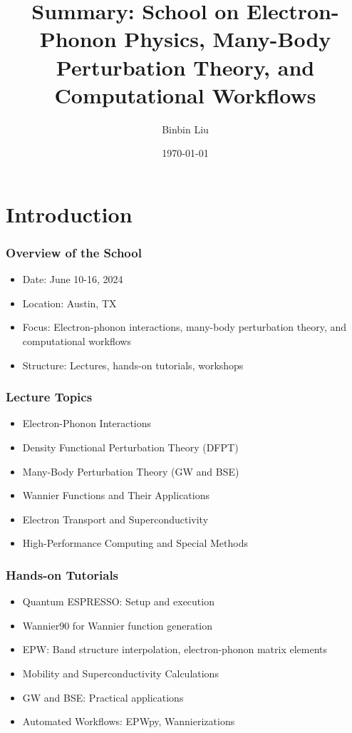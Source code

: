 \documentclass{CustomBeamer}
\title{Summary: School on Electron-Phonon Physics, Many-Body Perturbation Theory, and Computational Workflows}
\author{Binbin Liu}
\institute{THEOS, EPFL}
\date{\today}
\begin{document}
\begin{frame}
    \titlepage
\end{frame}

\section{Introduction}
\begin{frame}
\frametitle{Overview of the School}
\begin{itemize}
    \item Date: June 10-16, 2024
    \item Location: Austin, TX
    \item Focus: Electron-phonon interactions, many-body perturbation theory, and computational workflows
    \item Structure: Lectures, hands-on tutorials, workshops
\end{itemize}
\end{frame}

\begin{frame}
    \frametitle{Lecture Topics}
    \begin{itemize}
        \item Electron-Phonon Interactions
        \item Density Functional Perturbation Theory (DFPT)
        \item Many-Body Perturbation Theory (GW and BSE) %
        \item Wannier Functions and Their Applications
        \item Electron Transport and Superconductivity %
        \item High-Performance Computing and Special Methods
    \end{itemize}
    \end{frame}
    
    \begin{frame}
    \frametitle{Hands-on Tutorials}
    \begin{itemize}
        \item Quantum ESPRESSO: Setup and execution
        \item Wannier90 for Wannier function generation
        \item EPW: Band structure interpolation, electron-phonon matrix elements
        \item Mobility and Superconductivity Calculations
        \item GW and BSE: Practical applications
        \item Automated Workflows: EPWpy, Wannierizations
    \end{itemize}
    \end{frame}
    
\end{document}
